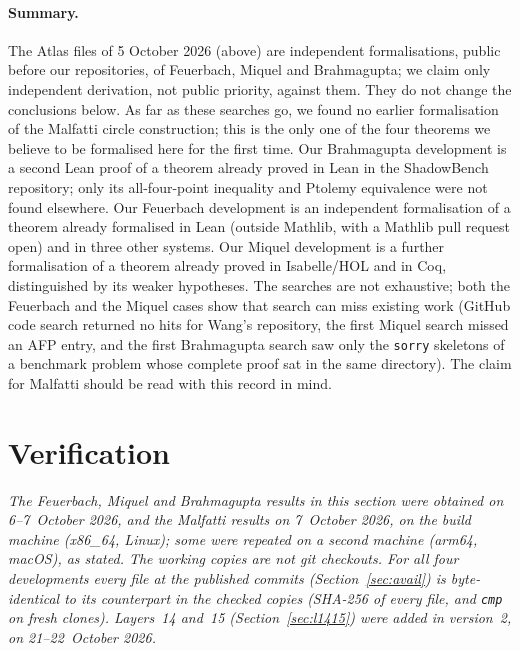 \documentclass[11pt]{article}
\theoremstyle{definition}
\theoremstyle{remark}
\newcommand{\lean}[1]{\texttt{#1}}
\begin{document}
\paragraph{Summary.} The Atlas files of 5 October 2026 (above) are independent formalisations, public before our repositories,
of Feuerbach, Miquel and Brahmagupta; we claim only independent derivation, not public priority, against them. They do not change the conclusions below. As far as these searches go, we found no earlier formalisation of the
Malfatti circle construction; this is the only one of the four theorems we believe to be formalised
here for the first time. Our Brahmagupta development is a second Lean proof of a theorem already
proved in Lean in the ShadowBench repository; only its all-four-point inequality and Ptolemy
equivalence were not found elsewhere. Our Feuerbach development is
an independent formalisation of a theorem already formalised in Lean (outside Mathlib, with a
Mathlib pull request open) and in three other systems. Our Miquel development is a further
formalisation of a theorem already proved in Isabelle/HOL and in Coq, distinguished by its weaker
hypotheses. The searches are not exhaustive; both the Feuerbach and the Miquel cases show that
search can miss existing work (GitHub code search returned no hits for Wang's repository, the
first Miquel search missed an AFP entry, and the first Brahmagupta search saw only the
\lean{sorry} skeletons of a benchmark problem whose complete proof sat in the same directory).
The claim for Malfatti should be read with this record in mind.

\section{Verification}\label{sec:verify}

\emph{The Feuerbach, Miquel and Brahmagupta results in this section were obtained on 6--7~October
2026, and the Malfatti results on 7~October 2026, on the build machine (x86\_64, Linux); some were
repeated on a second machine (arm64, macOS), as stated. The working copies are not git checkouts.
For all four developments every  file at the published commits
(Section~\ref{sec:avail}) is byte-identical to its counterpart in the checked copies (SHA-256 of every  file, and \lean{cmp} on fresh clones).
Layers~14 and~15 (Section~\ref{sec:l1415}) were added in version~2, on 21--22~October 2026.}
\end{document}
